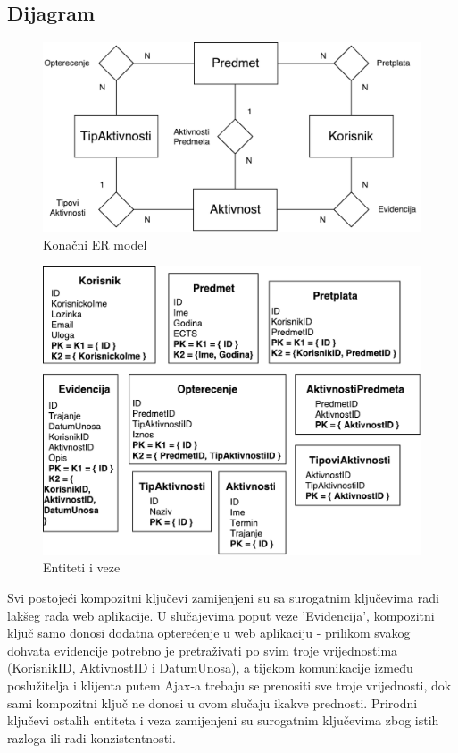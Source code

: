 \documentclass[times, utf8, zavrsni]{fer}
\begin{document}
\subsection{Dijagram}

\begin{figure}[H]
\centering
\includegraphics[scale=0.8]{img/er-model.pdf}
\caption{Konačni ER model}
\label{fig:er-model}
\end{figure}

\begin{figure}[H]
\centering
\includegraphics[scale=0.8]{img/er-model-opis.pdf}
\caption{Entiteti i veze}
\label{fig:er-model-opis}
\end{figure}

Svi postojeći kompozitni ključevi zamijenjeni su sa surogatnim ključevima radi lakšeg rada web aplikacije. U slučajevima poput veze 'Evidencija', kompozitni ključ samo donosi dodatna opterećenje u web aplikaciju - prilikom svakog dohvata evidencije potrebno je pretraživati po svim troje vrijednostima (KorisnikID, AktivnostID i DatumUnosa), a tijekom komunikacije između poslužitelja i klijenta putem Ajax-a trebaju se prenositi sve troje vrijednosti, dok sami kompozitni ključ ne donosi u ovom slučaju ikakve prednosti. Prirodni ključevi ostalih entiteta i veza zamijenjeni su surogatnim ključevima zbog istih razloga ili radi konzistentnosti.
\end{document}

